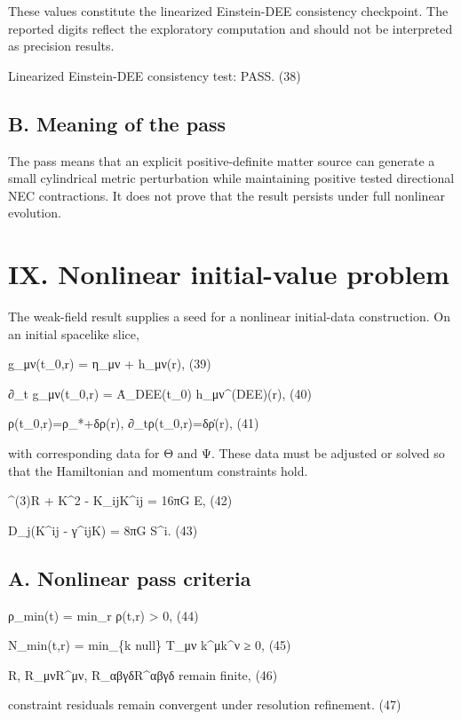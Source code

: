 These values constitute the linearized Einstein-DEE consistency
checkpoint. The reported digits reflect the exploratory computation and
should not be interpreted as precision results.

Linearized Einstein-DEE consistency test: PASS. (38)

\subsection{B. Meaning of the pass}\label{b.-meaning-of-the-pass}

The pass means that an explicit positive-definite matter source can
generate a small cylindrical metric perturbation while maintaining
positive tested directional NEC contractions. It does not prove that the
result persists under full nonlinear evolution.

\section{IX. Nonlinear initial-value
problem}\label{ix.-nonlinear-initial-value-problem}

The weak-field result supplies a seed for a nonlinear initial-data
construction. On an initial spacelike slice,

g\_μν(t\_0,r) = η\_μν + h\_μν(r), (39)

∂\_t g\_μν(t\_0,r) = Ȧ\_DEE(t\_0) h\_μν\^{}(DEE)(r), (40)

ρ(t\_0,r)=ρ\_*+δρ(r), ∂\_tρ(t\_0,r)=δρ̇(r), (41)

with corresponding data for Θ and Ψ. These data must be adjusted or
solved so that the Hamiltonian and momentum constraints hold.

\^{}(3)R + K\^{}2 - K\_ijK\^{}ij = 16πG E, (42)

D\_j(K\^{}ij - γ\^{}ijK) = 8πG S\^{}i. (43)

\subsection{A. Nonlinear pass
criteria}\label{a.-nonlinear-pass-criteria}

ρ\_min(t) = min\_r ρ(t,r) \textgreater{} 0, (44)

N\_min(t,r) = min\_\{k null\} T\_μν k\^{}μk\^{}ν ≥ 0, (45)

R, R\_μνR\^{}μν, R\_αβγδR\^{}αβγδ remain finite, (46)

constraint residuals remain convergent under resolution refinement. (47)

